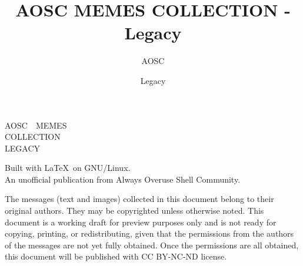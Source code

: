 \documentclass[10pt,a4paper]{report}
\title{AOSC MEMES COLLECTION - Legacy}
\author{AOSC}
\date{Legacy}
\begin{document}
\begin{titlepage}
	\leavevmode
	\vskip 50mm
	\begin{center}
        \rmfamily{}
		\parbox{75mm}{
            \center\rmfamily{}\Huge\baselineskip=40pt
            A\hfill O\hfill S\hfill C~~\hfill M\hfill E\hfill M\hfill E\hfill S\\
            C\hfill O\hfill L\hfill L\hfill E\hfill C\hfill T\hfill I\hfill O\hfill N\\
            \MakeUppercase{Legacy}
        }\par
		\vfill
        \sffamily
		\normalsize
        Built with \LaTeX~on GNU/Linux.\\
        An unofficial publication from Always Overuse Shell Community.
	\end{center}
\end{titlepage}




\begin{multicols*}{2}
	
\end{multicols*}




\clearpage
\leavevmode
\vfill
\small
\sffamily
The messages (text and images) collected in this document belong to their original authors.
They may be copyrighted unless otherwise noted.
This document is a working draft for preview purposes only and is not ready for copying, printing, or redistributing,
given that the permissions from the authors of the messages are not yet fully obtained.
Once the permissions are all obtained, this document will be published with CC BY-NC-ND license.
\end{document}

